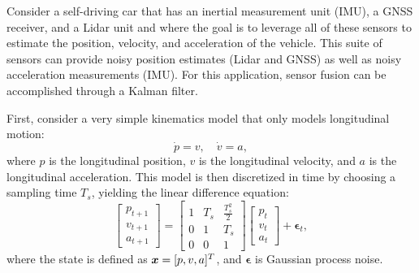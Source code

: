 \begin{example} \label{ex:car}
\theoremstyle{definition}
Consider a self-driving car that has an inertial measurement unit (IMU), a GNSS receiver, and a Lidar unit and where the goal is to leverage all of these sensors to estimate the position, velocity, and acceleration of the vehicle. This suite of sensors can provide noisy position estimates (Lidar and GNSS) as well as noisy acceleration measurements (IMU).
For this application, sensor fusion can be accomplished through a Kalman filter.

First, consider a very simple kinematics model that only models longitudinal motion:
\begin{equation*}
\dot{p} = v, \quad \dot{v} = a,
\end{equation*}
where $p$ is the longitudinal position, $v$ is the longitudinal velocity, and $a$ is the longitudinal acceleration. This model is then discretized in time by choosing a sampling time $T_s$, yielding the linear difference equation:
\begin{equation*}
\begin{bmatrix}
p_{t+1} \\ v_{t+1} \\ a_{t+1}
\end{bmatrix} = \begin{bmatrix}
1 & T_s & \frac{T_s^2}{2} \\
0 & 1 & T_s \\
0 & 0 & 1
\end{bmatrix}\begin{bmatrix}
p_{t} \\ v_{t} \\ a_{t}
\end{bmatrix} + \bm{\epsilon}_t,
\end{equation*}
where the state is defined as $\bm{x} = [p, v, a]^T$, and $\bm{\epsilon}$ is Gaussian process noise.


\end{example}
